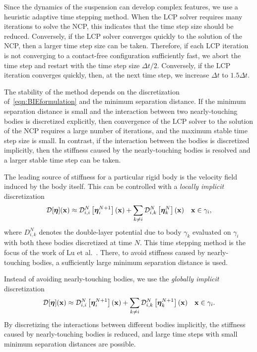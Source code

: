 \documentclass[AMA,STIX1COL]{WileyNJD-v2}
\begin{document}
Since the dynamics of the suspension can develop complex features, we
use a heuristic adaptive time stepping method.  When the LCP solver
requires many iterations to solve the NCP, this indicates that the time
step size should be reduced.  Conversely, if the LCP solver converges
quickly to the solution of the NCP, then a larger time step size can be
taken.  Therefore, if each LCP iteration is not converging to a
contact-free configuration sufficiently fast, we abort the time step and
restart with the time step size $\Delta t/2$. Conversely, if the LCP
iteration converges quickly, then, at the next time step, we increase
$\Delta t$ to $1.5\Delta t$.

The stability of the method depends on the discretization
of~\eqref{eqn:BIEformulation} and the minimum separation distance.  If
the minimum separation distance is small and the interaction between two
nearly-touching bodies is discretized explicitly, then convergence of
the LCP solver to the solution of the NCP requires a large number of
iterations, and the maximum stable time step size is small.  In
contrast, if the interaction between the bodies is discretized
implicitly, then the stiffness caused by the nearly-touching bodies is
resolved and a larger stable time step can be taken.

The leading source of stiffness for a particular rigid body is the
velocity field induced by the body itself. This can be controlled with a
{\em locally implicit} discretization
\begin{align}
  {\mathcal{D}}[{\boldsymbol\eta}]({\mathbf{x}}) \approx {\mathcal{D}}^{N}_{i,i}\left[{\boldsymbol\eta}_i^{N+1}\right]({\mathbf{x}}) + 
    \sum_{k \neq i} {\mathcal{D}}^{N}_{i,k}\left[{\boldsymbol\eta}_k^{N}\right]({\mathbf{x}})
    \quad {\mathbf{x}} \in \gamma_i,
  \label{eqn:BlockImplicit}
\end{align}
where $D_{i,k}^N$ denotes the double-layer potential due to body
$\gamma_k$ evaluated on $\gamma_i$ with both these bodies discretized at
time $N$.  This time stepping method is the focus of the work of Lu et
al.~\cite{Lu2017}.  There, to avoid stiffness caused by nearly-touching
bodies, a sufficiently large minimum separation distance is used.
 
Instead of avoiding nearly-touching bodies, we use the {\em globally
implicit} discretization
\begin{align}
  {\mathcal{D}}[{\boldsymbol\eta}]({\mathbf{x}}) \approx {\mathcal{D}}^{N}_{i,i}\left[{\boldsymbol\eta}_i^{N+1}\right]({\mathbf{x}}) + 
    \sum_{k \neq i} {\mathcal{D}}^{N}_{i,k}\left[{\boldsymbol\eta}_k^{N+1}\right]({\mathbf{x}})
    \quad {\mathbf{x}} \in \gamma_i.
  \label{eqn:SemiImplicit}
\end{align}
By discretizing the interactions between different bodies implicitly,
the stiffness caused by nearly-touching bodies is reduced, and large
time steps with small minimum separation distances are possible.
\end{document}
